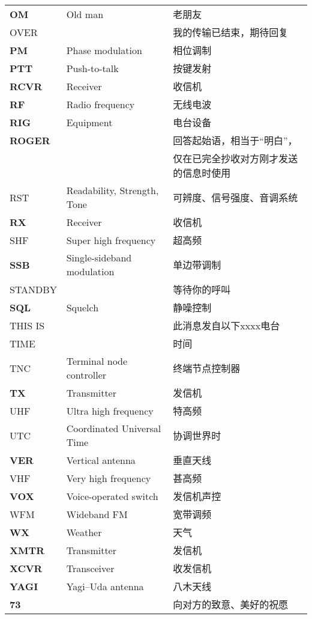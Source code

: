 \begin{longtable}[l]{lll}
	\textbf{OM} & Old man & 老朋友 \\%
	OVER & & 我的传输已结束，期待回复 \\
	\textbf{PM} & Phase modulation & 相位调制 \\
	\textbf{PTT} & Push-to-talk & 按键发射 \\
	\textbf{RCVR} & Receiver & 收信机 \\
	\textbf{RF} & Radio frequency & 无线电波 \\
	\textbf{RIG} & Equipment & 电台设备 \\
	\textbf{ROGER} & & 回答起始语，相当于“明白”， \\
	&  & 仅在已完全抄收对方刚才发送的信息时使用 \\
	RST & Readability, Strength, Tone & 可辨度、信号强度、音调系统 \\
	\textbf{RX} & Receiver & 收信机 \\
	SHF & Super high frequency & 超高频 \\
	\textbf{SSB} & Single-sideband modulation & 单边带调制 \\
	STANDBY & & 等待你的呼叫 \\
	\textbf{SQL} & Squelch & 静噪控制 \\
	THIS IS & & 此消息发自以下xxxx电台 \\
	TIME & & 时间 \\
	TNC & Terminal node controller & 终端节点控制器 \\
	\textbf{TX} & Transmitter & 发信机 \\
	UHF & Ultra high frequency & 特高频 \\
	UTC & Coordinated Universal Time & 协调世界时 \\
	\textbf{VER} & Vertical antenna & 垂直天线 \\
	VHF & Very high frequency & 甚高频 \\
	\textbf{VOX} & Voice-operated switch & 发信机声控 \\
	WFM & Wideband FM & 宽带调频 \\
	\textbf{WX} & Weather & 天气 \\
	\textbf{XMTR} & Transmitter & 发信机 \\
	\textbf{XCVR} & Transceiver & 收发信机 \\
	\textbf{YAGI} & Yagi–Uda antenna & 八木天线 \\
	\textbf{73} & & 向对方的致意、美好的祝愿 \\
\end{longtable}


\newpage

